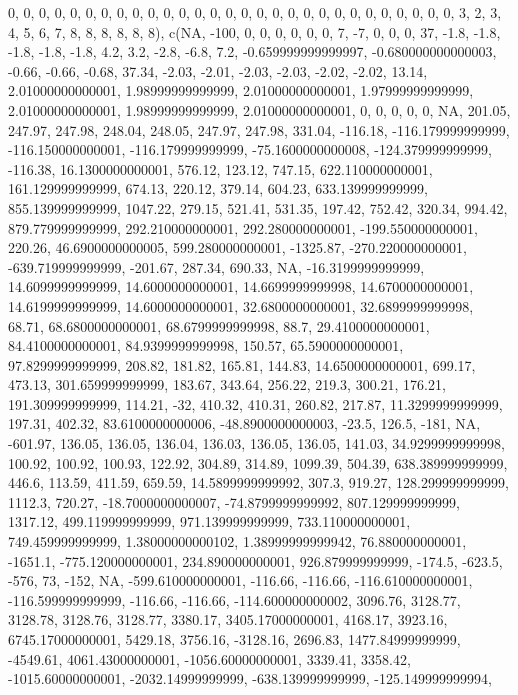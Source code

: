 \documentclass[
]{article}
\begin{document}
0, 0, 0, 0, 0, 0, 0, 0, 0, 0, 0, 0, 0, 0, 0, 0, 0, 0, 0, 0, 0, 0, 0, 0,
0, 0, 0, 0, 0, 3, 2, 3, 4, 5, 6, 7, 8, 8, 8, 8, 8, 8), c(NA, -100, 0, 0,
0, 0, 0, 0, 7, -7, 0, 0, 0, 37, -1.8, -1.8, -1.8, -1.8, -1.8, 4.2, 3.2,
-2.8, -6.8, 7.2, -0.659999999999997, -0.680000000000003, -0.66, -0.66,
-0.68, 37.34, -2.03, -2.01, -2.03, -2.03, -2.02, -2.02, 13.14,
2.01000000000001, 1.98999999999999, 2.01000000000001, 1.97999999999999,
2.01000000000001, 1.98999999999999, 2.01000000000001, 0, 0, 0, 0, 0, NA,
201.05, 247.97, 247.98, 248.04, 248.05, 247.97, 247.98, 331.04, -116.18,
-116.179999999999, -116.150000000001, -116.179999999999,
-75.1600000000008, -124.379999999999, -116.38, 16.1300000000001, 576.12,
123.12, 747.15, 622.110000000001, 161.129999999999, 674.13, 220.12,
379.14, 604.23, 633.139999999999, 855.139999999999, 1047.22, 279.15,
521.41, 531.35, 197.42, 752.42, 320.34, 994.42, 879.779999999999,
292.210000000001, 292.280000000001, -199.550000000001, 220.26,
46.6900000000005, 599.280000000001, -1325.87, -270.220000000001,
-639.719999999999, -201.67, 287.34, 690.33, NA, -16.3199999999999,
14.6099999999999, 14.6000000000001, 14.6699999999998, 14.6700000000001,
14.6199999999999, 14.6000000000001, 32.6800000000001, 32.6899999999998,
68.71, 68.6800000000001, 68.6799999999998, 88.7, 29.4100000000001,
84.4100000000001, 84.9399999999998, 150.57, 65.5900000000001,
97.8299999999999, 208.82, 181.82, 165.81, 144.83, 14.6500000000001,
699.17, 473.13, 301.659999999999, 183.67, 343.64, 256.22, 219.3, 300.21,
176.21, 191.309999999999, 114.21, -32, 410.32, 410.31, 260.82, 217.87,
11.3299999999999, 197.31, 402.32, 83.6100000000006, -48.8900000000003,
-23.5, 126.5, -181, NA, -601.97, 136.05, 136.05, 136.04, 136.03, 136.05,
136.05, 141.03, 34.9299999999998, 100.92, 100.92, 100.93, 122.92,
304.89, 314.89, 1099.39, 504.39, 638.389999999999, 446.6, 113.59,
411.59, 659.59, 14.5899999999992, 307.3, 919.27, 128.299999999999,
1112.3, 720.27, -18.7000000000007, -74.8799999999992, 807.129999999999,
1317.12, 499.119999999999, 971.139999999999, 733.110000000001,
749.459999999999, 1.38000000000102, 1.38999999999942, 76.880000000001,
-1651.1, -775.120000000001, 234.890000000001, 926.879999999999, -174.5,
-623.5, -576, 73, -152, NA, -599.610000000001, -116.66, -116.66,
-116.610000000001, -116.599999999999, -116.66, -116.66,
-114.600000000002, 3096.76, 3128.77, 3128.78, 3128.76, 3128.77, 3380.17,
3405.17000000001, 4168.17, 3923.16, 6745.17000000001, 5429.18, 3756.16,
-3128.16, 2696.83, 1477.84999999999, -4549.61, 4061.43000000001,
-1056.60000000001, 3339.41, 3358.42, -1015.60000000001,
-2032.14999999999, -638.139999999999, -125.149999999994,
\end{document}
